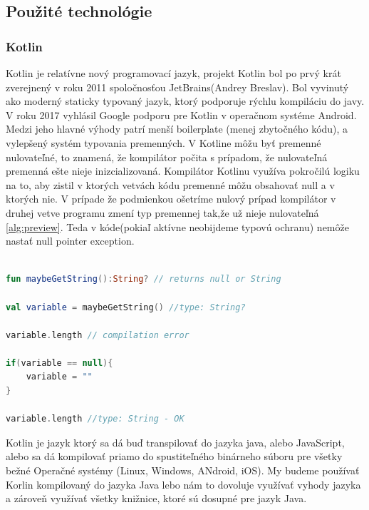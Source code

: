 
  

\subsection{Použité technológie} 

  

\subsubsection{Kotlin} 

Kotlin je relatívne nový programovací jazyk, projekt Kotlin bol po prvý krát zverejnený v roku 2011 spoločnosťou JetBrains(Andrey Breslav). Bol vyvinutý ako moderný staticky typovaný jazyk, ktorý podporuje rýchlu kompiláciu do javy. V roku 2017 vyhlásil Google podporu pre Kotlin v operačnom systéme Android.  
Medzi jeho hlavné výhody patrí menší boilerplate (menej zbytočného kódu), a vylepšený systém typovania premenných. V Kotline  môžu byť premenné nulovateľné, to znamená, že kompilátor počita s prípadom, že nulovateľná premenná ešte nieje inizcializovaná. Kompilátor Kotlinu využíva pokročilú logiku na to, aby zistil v ktorých vetvách kódu premenné môžu obsahovať null a v ktorých nie. V prípade že podmienkou ošetríme nulový prípad kompilátor v druhej vetve programu zmení typ premennej tak,že už nieje nulovateľná \ref{alg:preview}. Teda v kóde(pokiaľ aktívne neobijdeme typovú ochranu) nemôže nastať null pointer exception.



\begin{lstlisting}[caption={Ukážka funkcie typov v jazyku Kotlin},label={alg:preview},language=Kotlin]

fun maybeGetString():String? // returns null or String

val variable = maybeGetString() //type: String?

variable.length // compilation error

if(variable == null){
	variable = ""
}

variable.length //type: String - OK

\end{lstlisting}


Kotlin je jazyk ktorý sa dá buď transpilovať do jazyka java, alebo JavaScript, alebo sa dá kompilovať priamo do spustiteľného  binárneho súboru
pre všetky bežné Operačné systémy (Linux, Windows, ANdroid, iOS). My budeme používať Korlin kompilovaný do jazyka Java lebo nám to dovoluje využívať vyhody jazyka a zároveň využívať všetky knižnice, ktoré sú dosupné pre jazyk Java.


